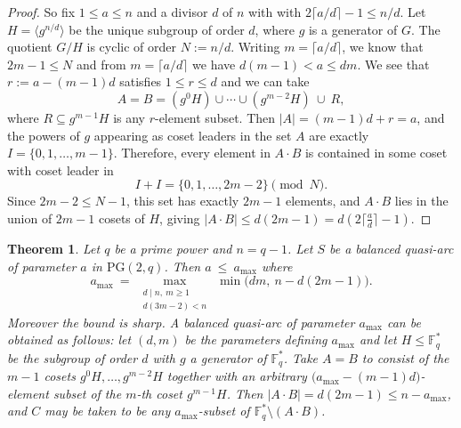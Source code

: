\documentclass{article}
\newtheorem{theorem}{Theorem}
\newcommand{\PG}{\mathrm{PG}}
\newcommand{\F}{\mathbb{F}}
\begin{document}
\begin{proof}
So fix $1\leq a\leq n$ and a divisor $d$ of $n$ with with $2\lceil a/d\rceil-1\le
n/d$. Let $H=\langle g^{n/d}\rangle$ be the unique subgroup of order $d$, where $g$ is a generator of $G$. The quotient $G/H$ is cyclic of order $N:=n/d$.
Writing $m=\lceil a/d\rceil$, we know that $2m-1\le N$ and from
$m=\lceil a/d\rceil$ we have $d(m-1)<a\le dm$. We see that $r:=a-(m-1)d$ satisfies
$1\le r\le d$ and we can take
\[
  A=B=(g^0H)\cup\cdots\cup(g^{m-2}H)\ \cup\ R,
\]
where $R\subseteq g^{m-1}H$ is any $r$-element subset. Then $|A|=(m-1)d+r=a$, and
the powers of $g$ appearing as coset leaders in the set $A$ are exactly $I=\{0,1,\dots,m-1\}$. Therefore, every element in $A\cdot B$ is contained in some coset with coset leader
in \[
  I+I=\{0,1,\dots,2m-2\}\pmod N .
\]
Since $2m-2\le N-1$, this set has exactly $2m-1$ elements, and $A\cdot B$ lies in the union of $2m-1$ cosets of $H$, giving
$|A\cdot B|\le d(2m-1)=d\left(2\lceil \frac{a}{d}\rceil-1\right)$. 
\end{proof}

\begin{theorem}\label{thm:main}
Let $q$ be a prime power and $n=q-1$. Let $S$ be a balanced quasi-arc of parameter
$a$ in $\PG(2,q)$. Then   $a\ \le\ a_{\max}$ where%
\[
  a_{\max}\ =\ \max_{\substack{d\mid n,\ m\ge 1\\ d(3m-2)<n}}
  \ \min\bigl(dm,\ n-d(2m-1)\bigr).
\]
Moreover the bound is sharp. A balanced quasi-arc of parameter
$a_{\max}$ can be obtained as follows: let $(d,m)$ be the parameters defining $a_{\max}$
and let $H\le \F_q^\ast$ be the subgroup of order $d$ with $g$
a generator of $\F_q^\ast$. Take $A=B$ to consist of the $m-1$ cosets
$g^0H,\dots,g^{m-2}H$ together with an arbitrary $\bigl(a_{\max}-(m-1)d\bigr)$-element
subset of the $m$-th coset $g^{m-1}H$. Then
$|A\cdot B|=d(2m-1)\le n-a_{\max}$, and $C$ may be taken to be any $a_{\max}$-subset of
$\F_q^\ast\setminus(A\cdot B)$.
\end{theorem}
\end{document}
